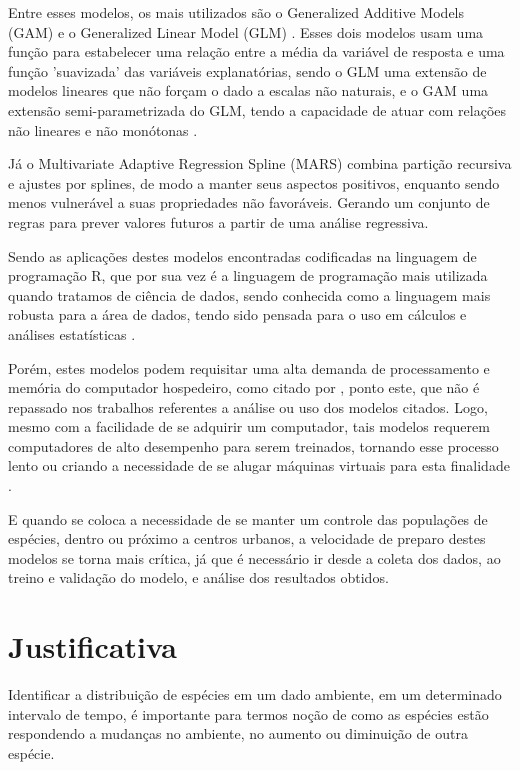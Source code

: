 \documentclass[
    12pt,               %
    openright,          %
    oneside,            %
    a4paper,            %
    english,            %
    brazil              %
    ]{abntex2}
\begin{document}
Entre esses modelos, os mais utilizados são o Generalized Additive Models (GAM) \cite{GAM}
e o Generalized Linear Model (GLM) \cite{GLM}. Esses dois modelos usam uma função para 
estabelecer uma relação entre a média da variável de resposta e uma função 'suavizada'
das variáveis explanatórias, sendo o GLM uma extensão de modelos lineares que não
forçam o dado a escalas não naturais, e o GAM uma extensão semi-parametrizada do GLM,
tendo a capacidade de atuar com relações não lineares e não monótonas \cite{GAMeGLM_especie_estudo}. 

Já o Multivariate Adaptive Regression Spline (MARS) combina partição recursiva e ajustes
por splines, de modo a manter seus aspectos positivos, enquanto sendo menos vulnerável a 
suas propriedades não favoráveis. Gerando um conjunto de regras para prever
valores futuros a partir de uma análise regressiva. \cite{MARS} 

Sendo as aplicações destes modelos encontradas codificadas na linguagem de programação R, que por
sua vez é a linguagem de programação mais utilizada quando tratamos de ciência de dados, sendo conhecida
como a linguagem mais robusta para a área de dados, tendo sido pensada para o uso em cálculos e
análises estatísticas \cite{linguagem_r}.

Porém, estes modelos podem requisitar uma alta demanda de processamento e memória do computador hospedeiro, 
como citado por \cite{modelagem_comp}, ponto este, que não é repassado nos trabalhos referentes a análise 
ou uso dos modelos citados. Logo, mesmo com a facilidade de se adquirir um computador, tais modelos
requerem computadores de alto desempenho para serem treinados, tornando esse processo lento ou criando 
a necessidade de se alugar máquinas virtuais para esta finalidade \cite{global_cloud_maketing}. 

E quando se coloca a necessidade de se manter um controle das populações de espécies, dentro ou próximo
a centros urbanos, a velocidade de preparo destes modelos se torna mais crítica, já que é necessário ir
desde a coleta dos dados, ao treino e validação do modelo, e análise dos resultados obtidos.
 
\section{Justificativa}

Identificar a distribuição de espécies em um dado ambiente, em um determinado intervalo de tempo, 
é importante para termos noção de como as espécies estão respondendo a mudanças no ambiente, no aumento 
ou diminuição de outra espécie.
\end{document}
